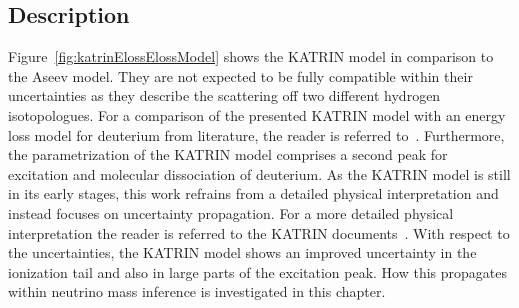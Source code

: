 \subsection{Description}
Figure~\ref{fig:katrinElossElossModel} shows the KATRIN model in comparison to the Aseev model. They are not expected to be fully compatible within their uncertainties as they describe the scattering off two different hydrogen isotopologues. For a comparison of the presented KATRIN model with an energy loss model for deuterium from literature, the reader is referred to~\cite{Rodenbeck2019}. Furthermore, the parametrization of the KATRIN model comprises a second peak for excitation and molecular dissociation of deuterium. As the KATRIN model is still in its early stages, this work refrains from a detailed physical interpretation and instead focuses on uncertainty propagation. For a more detailed physical interpretation the reader is referred to the KATRIN documents~\cite{Rodenbeck2019,Hannen2019_1,Hannen2019_2}. With respect to the uncertainties, the KATRIN model shows an improved uncertainty in the ionization tail and also in large parts of the excitation peak. How this propagates within neutrino mass inference is investigated in this chapter.

